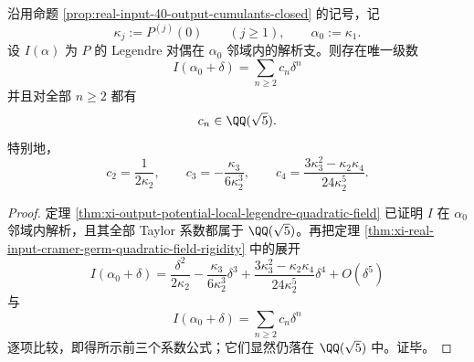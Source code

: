 \begin{proposition}\label{prop:xi-time-part9xb-output-cramer-series-quadratic-field}
沿用命题 \ref{prop:real-input-40-output-cumulants-closed} 的记号，记
\[
\kappa_j:=P^{(j)}(0)\qquad (j\ge 1),
\qquad
\alpha_0:=\kappa_1.
\]
设 \(I(\alpha)\) 为 \(P\) 的 Legendre 对偶在 \(\alpha_0\) 邻域内的解析支。则存在唯一级数
\[
I(\alpha_0+\delta)=\sum_{n\ge 2}c_n\delta^n
\]
并且对全部 \(n\ge 2\) 都有
\[
c_n\in \QQ(\sqrt5).
\]
特别地，
\[
c_2=\frac{1}{2\kappa_2},
\qquad
c_3=-\frac{\kappa_3}{6\kappa_2^3},
\qquad
c_4=\frac{3\kappa_3^2-\kappa_2\kappa_4}{24\kappa_2^5}.
\]
\end{proposition}
\begin{proof}
定理 \ref{thm:xi-output-potential-local-legendre-quadratic-field} 已证明 \(I\) 在 \(\alpha_0\) 邻域内解析，且其全部 Taylor 系数都属于 \(\QQ(\sqrt5)\)。再把定理 \ref{thm:xi-real-input-cramer-germ-quadratic-field-rigidity} 中的展开
\[
I(\alpha_0+\delta)
=
\frac{\delta^2}{2\kappa_2}
-\frac{\kappa_3}{6\kappa_2^3}\delta^3
+\frac{3\kappa_3^2-\kappa_2\kappa_4}{24\kappa_2^5}\delta^4
+O(\delta^5)
\]
与
\[
I(\alpha_0+\delta)=\sum_{n\ge 2}c_n\delta^n
\]
逐项比较，即得所示前三个系数公式；它们显然仍落在 \(\QQ(\sqrt5)\) 中。证毕。
\end{proof}

